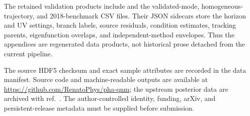 \documentclass[11pt,a4paper]{article}
\begin{document}
The retained validation products include
 and the validated-mode,
homogeneous-trajectory, and 2018-benchmark CSV files.  Their JSON sidecars
store the horizon and
UV settings, branch labels, source residuals, condition estimates, tracking
parents, eigenfunction overlaps, and independent-method envelopes.  Thus the
appendices are regenerated data products, not historical prose detached from
the current pipeline.

The source HDF5 checksum and exact sample attributes are recorded in the data
manifest.  Source code and machine-readable outputs are available at
\url{https://github.com/RenatoPhys/pha-qnm}; the upstream posterior data are
archived with ref.~\cite{HippertZenodo}.  The author-controlled identity,
funding, arXiv, and persistent-release metadata must be supplied before
submission.



\end{document}
